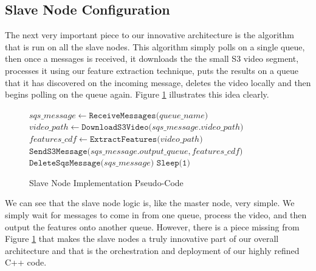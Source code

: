 \subsection{\label{subsection:slave_node}Slave Node Configuration }
The next very important piece to our innovative architecture is the algorithm
that is run on all the slave nodes. This algorithm simply polls on a single
queue, then once a messages is received, it downloads the the small S3 video
segment, processes it using our feature extraction technique, puts the results
on a queue that it has discovered on the incoming message, deletes the video
locally and then begins polling on the queue again. Figure \ref{alg:slave_node}
illustrates this idea clearly.

\begin{figure}[h]

\begin{algorithmic}[1]

    \State $sqs\_message \gets \texttt{ReceiveMessages(} queue\_name \texttt{)}$ 
    \State $video\_path \gets \texttt{DownloadS3Video(} sqs\_message.video\_path \texttt{)}$
    \State $features\_cdf \gets \texttt{ExtractFeatures(} video\_path \texttt{)}$ 
    \State $\texttt{SendS3Message(} sqs\_message.output\_queue, features\_cdf \texttt{)}$
    \State $\texttt{DeleteSqsMessage(} sqs\_message \texttt{)}$ 
    \State $\texttt{Sleep(1)}$
  \EndWhile
\end{algorithmic}
\caption{Slave Node Implementation Pseudo-Code}
\label{alg:slave_node}
\end{figure}

We can see that the slave node logic is, like the master node, very simple. We
simply wait for messages to come in from one queue, process the video, and then
output the features onto another queue. However, there is a piece missing from
Figure \ref{alg:slave_node} that makes the slave nodes a truly innovative
part of our overall architecture and that is the orchestration and deployment
of our highly refined C++ code.

